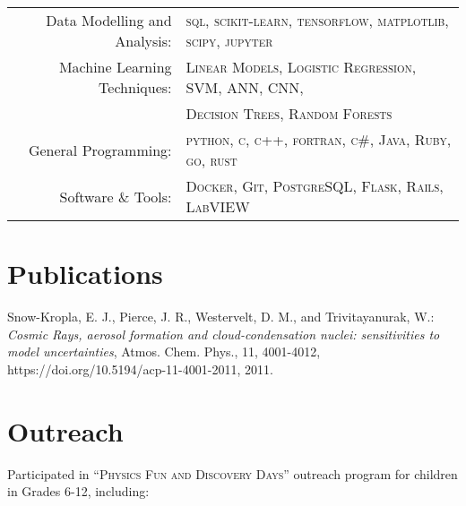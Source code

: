 \documentclass[a4paper,11pt]{article} %
\begin{document}
\begin{tabular}{rl}

Data Modelling and Analysis: & \textsc{sql}, \textsc{scikit-learn}, \textsc{tensorflow}, \textsc{matplotlib}, \textsc{scipy}, \textsc{jupyter} \\

Machine Learning Techniques: & \textsc{Linear Models}, \textsc{Logistic Regression}, \textsc{SVM}, \textsc{ANN}, \textsc{CNN}, \\
& \textsc{Decision Trees}, \textsc{Random Forests} \\

General Programming: & \textsc{python}, \textsc{c}, \textsc{c++}, \textsc{fortran}, \textsc{c\#}, \textsc{Java}, \textsc{Ruby}, \textsc{go}, \textsc{rust} \\

Software \& Tools: & \textsc{Docker}, \textsc{Git}, \textsc{PostgreSQL}, \textsc{Flask}, \textsc{Rails}, \textsc{LabVIEW} \\
\end{tabular}


\section{Publications}
Snow-Kropla, E. J., Pierce, J. R., Westervelt, D. M., and Trivitayanurak, W.: \emph{Cosmic Rays, aerosol formation and cloud-condensation nuclei: sensitivities to model uncertainties}, Atmos. Chem. Phys., 11, 4001-4012, https://doi.org/10.5194/acp-11-4001-2011, 2011.


\section{Outreach}
Participated in \textsc{``Physics Fun and Discovery Days''} outreach program for children in Grades 6-12, including:\\
\end{document}
